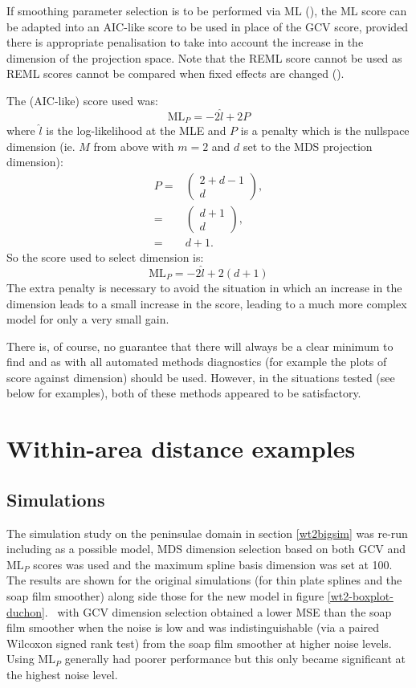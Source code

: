 If smoothing parameter selection is to be performed via ML (\cite{remlpaper}), the ML score can be adapted into an AIC-like score to be used in place of the GCV score, provided there is appropriate penalisation to take into account the increase in the dimension of the projection space. Note that the REML score cannot be used as REML scores cannot be compared when fixed effects are changed (\cite{remlpaper}).

The (AIC-like) score used was:
\begin{equation*}
\text{ML}_P = -2 \hat{l} + 2P
\end{equation*}
where $\hat{l}$ is the log-likelihood at the MLE and $P$ is a penalty which is the nullspace dimension (ie. $M$ from above with $m=2$ and $d$ set to the MDS projection dimension):
\begin{align*}
P =& \begin{pmatrix} 2+d-1 \\ d  \end{pmatrix},\\
=& \begin{pmatrix} d+1 \\ d  \end{pmatrix},\\
=& d+1.
\end{align*}
So the score used to select dimension is:
\begin{equation*}
\text{ML}_P = -2 \hat{l} + 2(d+1)
\end{equation*}
The extra penalty is necessary to avoid the situation in which an increase in the dimension leads to a small increase in the score, leading to a much more complex model for only a very small gain.

There is, of course, no guarantee that there will always be a clear minimum to find and as with all automated methods diagnostics (for example the plots of score against dimension) should be used. However, in the situations tested (see below for examples), both of these methods appeared to be satisfactory.

\section{Within-area distance examples}
\label{gds-wad-examples}
\subsection{Simulations}

The simulation study on the peninsulae domain in section \ref{wt2bigsim} was re-run including \mdsds as a possible model, MDS dimension selection based on both GCV and $\text{ML}_P$ scores was used and the maximum spline basis dimension was set at 100. The results are shown for the original simulations (for thin plate splines and the soap film smoother) along side those for the new model in figure \ref{wt2-boxplot-duchon}. \mdsds\ with GCV dimension selection obtained a lower MSE than the soap film smoother when the noise is low and was indistinguishable (via a paired Wilcoxon signed rank test) from the soap film smoother at higher noise levels. Using $\text{ML}_P$ generally had poorer performance but this only became significant at the highest noise level.

